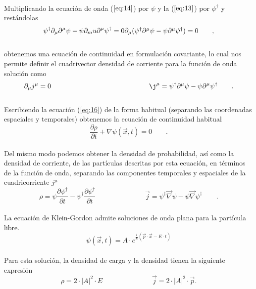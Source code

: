 \documentclass[11pt,letterpaper]{article}     %
\begin{document}
\\Multiplicando la ecuación de onda ($\ref{eq:14}$) por $\psi$ y la ($\ref{eq:13}$) 
por $\psi^\dagger$  y restándolas
\begin{equation} \label{eq:15}
\psi^\dagger \partial_\mu \partial^\mu \psi - \psi \partial_mu \partial^\mu \psi ^\dagger = 0
$$\\$$
\partial_\mu (\psi^\dagger \partial^\mu \psi - \psi \partial^\mu \psi^\dagger)=0 \qquad ,
\end{equation}
\\obtenemos una ecuación de continuidad en formulación covariante, lo cual nos permite definir el cuadrivector densidad de corriente para la función de onda solución como
\begin{equation} \label{eq:16}
\partial_\mu j^\mu = 0 \hspace{5cm}
\j^\mu = \psi^\dagger \partial^\mu \psi - \psi \partial^\mu \psi^\dagger \qquad .
\end{equation}
\\Escribiendo la ecuación (\ref{eq:16}) de la forma habitual (separando las coordenadas espaciales y temporales) obtenemos la ecuación de continuidad habitual
\begin{equation} \label{eq:17}
\frac{\partial \rho}{\partial t} + \nabla \psi (\vec{x},t)=0 \qquad .
\end{equation}
\\Del mismo modo podemos obtener la densidad de probabilidad, así como la densidad de corriente, de las partículas descritas por esta ecuación, en términos de la función de onda, separando las componentes temporales y espaciales de la cuadricorriente $j^\mu$
\begin{equation} \label{eq:18}
\rho = \psi \frac{\partial \psi^\dagger}{\partial t} - \psi^\dagger \frac{\partial \psi^\dagger}{\partial t} \hspace{3cm}\vec{j} = \psi^\dagger \vec{\nabla} \psi - \psi \vec{\nabla} \psi^\dagger \qquad.
\end{equation}
\\La ecuación de Klein-Gordon admite soluciones de onda plana para la partícula libre.
\begin{equation} \label{eq:19}
\psi(\vec{x},t)=A \cdot e^{\frac{i}{\hbar}(\vec{p}\cdot \vec{x}-E \cdot t)}
\end{equation}
\\Para esta solución, la densidad de carga y la densidad tienen la siguiente expresión
\begin{equation} \label{eq:20}
\rho = 2 \cdot |A|^2 \cdot E \hspace{3cm} \vec{j} = 2\cdot |A|^2 \cdot \vec{p}.
\end{equation}
\end{document}
